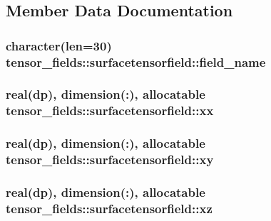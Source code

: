 \subsection{Member Data Documentation}
\hypertarget{structtensor__fields_1_1surfacetensorfield_a6241fa2dbe9213be9513224867e692c9}{
\subsubsection[{field\-\_\-name}]{\setlength{\rightskip}{0pt plus 5cm}character(len=30) tensor\-\_\-fields\-::surfacetensorfield\-::field\-\_\-name}}\label{structtensor__fields_1_1surfacetensorfield_a6241fa2dbe9213be9513224867e692c9}
\hypertarget{structtensor__fields_1_1surfacetensorfield_add6ff60aebfd2e917eb58087dad1e7b4}{
\subsubsection[{xx}]{\setlength{\rightskip}{0pt plus 5cm}real(dp), dimension(\-:), allocatable tensor\-\_\-fields\-::surfacetensorfield\-::xx}}\label{structtensor__fields_1_1surfacetensorfield_add6ff60aebfd2e917eb58087dad1e7b4}
\hypertarget{structtensor__fields_1_1surfacetensorfield_ad8d87dfab3bb168804487dca75acce71}{
\subsubsection[{xy}]{\setlength{\rightskip}{0pt plus 5cm}real(dp), dimension(\-:), allocatable tensor\-\_\-fields\-::surfacetensorfield\-::xy}}\label{structtensor__fields_1_1surfacetensorfield_ad8d87dfab3bb168804487dca75acce71}
\hypertarget{structtensor__fields_1_1surfacetensorfield_a8493e4a908b989c835e79e5e5e91133e}{
\subsubsection[{xz}]{\setlength{\rightskip}{0pt plus 5cm}real(dp), dimension(\-:), allocatable tensor\-\_\-fields\-::surfacetensorfield\-::xz}}\label{structtensor__fields_1_1surfacetensorfield_a8493e4a908b989c835e79e5e5e91133e}
